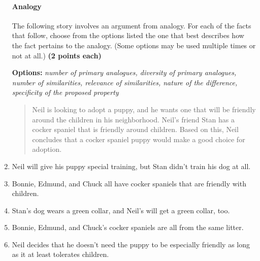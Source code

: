 \documentclass[10pt]{article}
\begin{document}
\begin{enumerate}
\vspace{.5cm}

\paragraph{Analogy}

The following story involves an argument from analogy.  For each of the facts that follow, choose from the options listed the one that best describes how the fact pertains to the analogy. (Some options may be used multiple times or not at all.) \textbf{(2 points each)}

\begin{center}\textbf{Options:} \textit{number of primary analogues, diversity of primary analogues, number of similarities, relevance of similarities, nature of the difference, specificity of the proposed property} \end{center}

\begin{quote}
  Neil is looking to adopt a puppy, and he wants one that will be friendly around the children in his neighborhood. Neil's friend Stan has a cocker spaniel that is friendly around children.  Based on this, Neil concludes that a cocker spaniel puppy would make a good choice for adoption.
\end{quote}

\setlength\itemsep{5mm}

\item Neil will give his puppy special training, but Stan didn't train his dog at all.\underline{\hspace{5cm}}

\item Bonnie, Edmund, and Chuck all have cocker spaniels that are friendly with children.\underline{\hspace{5cm}}

\item Stan's dog wears a green collar, and Neil's will get a green collar, too. \underline{\hspace{5cm}}

\item Bonnie, Edmund, and Chuck's cocker spaniels are all from the same litter.\underline{\hspace{5cm}}

\item Neil decides that he doesn't need the puppy to be especially friendly as long as it at least tolerates children.\underline{\hspace{5cm}}


\end{enumerate}
\end{document}
